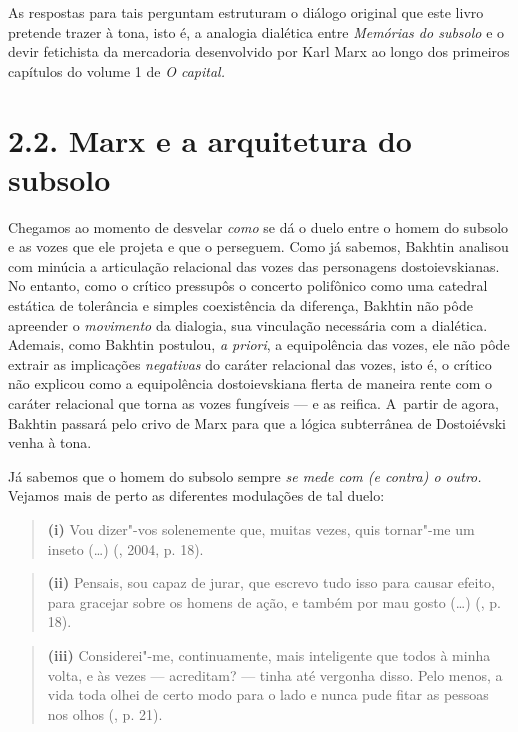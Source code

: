 As respostas para tais perguntam estruturam o diálogo original que este
livro pretende trazer à tona, isto é, a analogia dialética entre
\emph{Memórias do subsolo} e o devir fetichista da mercadoria
desenvolvido por Karl Marx ao longo dos primeiros capítulos do volume 1
de \emph{O capital. }

\section{2.2. Marx e a arquitetura do subsolo}

Chegamos ao momento de desvelar \emph{como} se dá o duelo entre o homem
do subsolo e as vozes que ele projeta e que o perseguem. Como já
sabemos, Bakhtin analisou com minúcia a articulação relacional das vozes
das personagens dostoievskianas. No entanto, como o crítico pressupôs o
concerto polifônico como uma catedral estática de tolerância e simples
coexistência da diferença, Bakhtin não pôde apreender o \emph{movimento}
da dialogia, sua vinculação necessária com a dialética. Ademais, como
Bakhtin postulou, \emph{a priori}, a equipolência das vozes, ele não
pôde extrair as implicações \emph{negativas} do caráter relacional das
vozes, isto é, o crítico não explicou como a equipolência dostoievskiana
flerta de maneira rente com o caráter relacional que torna as vozes
fungíveis --- e as reifica. A~partir de agora, Bakhtin passará pelo crivo
de Marx para que a lógica subterrânea de Dostoiévski venha à tona.

Já sabemos que o homem do subsolo sempre \emph{se mede com (e contra) o
outro.} Vejamos mais de perto as diferentes modulações de tal duelo:

\begin{quote}
\textbf{(i)} Vou dizer"-vos solenemente que, muitas vezes, quis tornar"-me
um inseto (\ldots) (, 2004, p. 18).
\end{quote}

\begin{quote}
\textbf{(ii)} Pensais, sou capaz de jurar, que escrevo tudo isso para
causar efeito, para gracejar sobre os homens de ação, e também por mau
gosto (\ldots) (, p. 18).
\end{quote}

\begin{quote}
\textbf{(iii)} Considerei"-me, continuamente, mais inteligente que todos
à minha volta, e às vezes --- acreditam? --- tinha até vergonha disso.
Pelo menos, a vida toda olhei de certo modo para o lado e nunca pude
fitar as pessoas nos olhos (, p. 21).
\end{quote}


